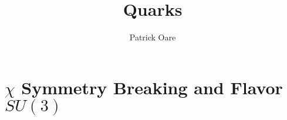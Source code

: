 \documentclass[11pt, oneside]{article}   	%
\title{Quarks}
\author{Patrick Oare}
\date{}							%
\theoremstyle{definition}
\begin{document}
\maketitle

\section{$\chi$ Symmetry Breaking and Flavor $SU(3)$}
\end{document}
